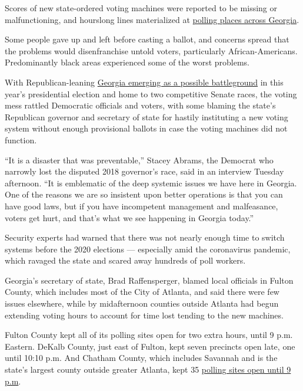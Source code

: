 Scores of new state-ordered voting machines were reported to be missing
or malfunctioning, and hourslong lines materialized at
\href{https://www.nytimes.com/2020/06/11/podcasts/the-daily/georgia-general-election.html}{polling
places across Georgia}.

Some people gave up and left before casting a ballot, and concerns
spread that the problems would disenfranchise untold voters,
particularly African-Americans. Predominantly black areas experienced
some of the worst problems.

With Republican-leaning
\href{https://www.nytimes.com/2020/06/09/us/politics/georgia-primary-election-senate-race-jon-ossoff.html}{Georgia
emerging as a possible battleground} in this year's presidential
election and home to two competitive Senate races, the voting mess
rattled Democratic officials and voters, with some blaming the state's
Republican governor and secretary of state for hastily instituting a new
voting system without enough provisional ballots in case the voting
machines did not function.

``It is a disaster that was preventable,'' Stacey Abrams, the Democrat
who narrowly lost the disputed 2018 governor's race, said in an
interview Tuesday afternoon. ``It is emblematic of the deep systemic
issues we have here in Georgia. One of the reasons we are so insistent
upon better operations is that you can have good laws, but if you have
incompetent management and malfeasance, voters get hurt, and that's what
we see happening in Georgia today.''

Security experts had warned that there was not nearly enough time to
switch systems before the 2020 elections --- especially amid the
coronavirus pandemic, which ravaged the state and scared away hundreds
of poll workers.

Georgia's secretary of state, Brad Raffensperger, blamed local officials
in Fulton County, which includes most of the City of Atlanta, and said
there were few issues elsewhere, while by midafternoon counties outside
Atlanta had begun extending voting hours to account for time lost
tending to the new machines.

Fulton County kept all of its polling sites open for two extra hours,
until 9 p.m. Eastern. DeKalb County, just east of Fulton, kept seven
precincts open late, one until 10:10 p.m. And Chatham County, which
includes Savannah and is the state's largest county outside greater
Atlanta, kept 35
\href{https://cccdn.blob.core.windows.net/cdn/Files/Elections/Election\%20Archive/2020/Press\%20Release\%20-\%20Extend\%20Poll\%20Hours\%20AUTHORIZED.pdf}{polling
sites open until 9 p.m}.

